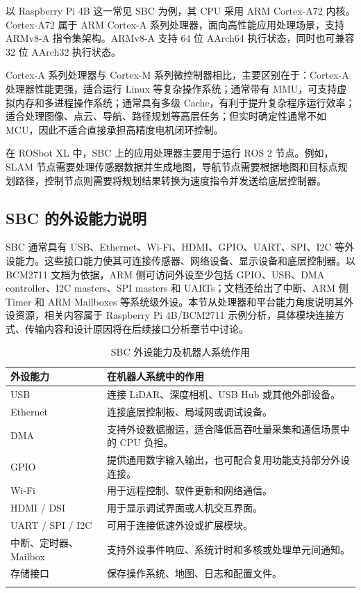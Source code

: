 \documentclass[UTF8,a4paper,12pt]{ctexrep}
\newcommand{\tabrowline}{\specialrule{0.25pt}{0pt}{0pt}}
\begin{document}
以 Raspberry Pi 4B 这一常见 SBC 为例，其 CPU 采用 ARM Cortex-A72 内核。Cortex-A72 属于 ARM Cortex-A 系列处理器，面向高性能应用处理场景，支持 ARMv8-A 指令集架构。ARMv8-A 支持 64 位 AArch64 执行状态，同时也可兼容 32 位 AArch32 执行状态。

Cortex-A 系列处理器与 Cortex-M 系列微控制器相比，主要区别在于：Cortex-A 处理器性能更强，适合运行 Linux 等复杂操作系统；通常带有 MMU，可支持虚拟内存和多进程操作系统；通常具有多级 Cache，有利于提升复杂程序运行效率；适合处理图像、点云、导航、路径规划等高层任务；但实时确定性通常不如 MCU，因此不适合直接承担高精度电机闭环控制。

在 ROSbot XL 中，SBC 上的应用处理器主要用于运行 ROS 2 节点。例如，SLAM 节点需要处理传感器数据并生成地图，导航节点需要根据地图和目标点规划路径，控制节点则需要将规划结果转换为速度指令并发送给底层控制器。

\subsection{SBC 的外设能力说明}

SBC 通常具有 USB、Ethernet、Wi-Fi、HDMI、GPIO、UART、SPI、I2C 等外设能力。这些接口能力使其可连接传感器、网络设备、显示设备和底层控制器。以 BCM2711 文档为依据，ARM 侧可访问外设至少包括 GPIO、USB、DMA controller、I2C masters、SPI masters 和 UARTs；文档还给出了中断、ARM 侧 Timer 和 ARM Mailboxes 等系统级外设。本节从处理器和平台能力角度说明其外设资源，相关内容属于 Raspberry Pi 4B/BCM2711 示例分析，具体模块连接方式、传输内容和设计原因将在后续接口分析章节中讨论。

\begin{table}[H]
  \centering
  \caption{SBC 外设能力及机器人系统作用}
  \label{tab:sbc-io}
  \small
  \begin{tabularx}{\textwidth}{L{3.4cm}Y}
    \toprule
    \textbf{外设能力} & \textbf{在机器人系统中的作用} \\
    \midrule
    USB & 连接 LiDAR、深度相机、USB Hub 或其他外部设备。 \\
    \tabrowline
    Ethernet & 连接底层控制板、局域网或调试设备。 \\
    \tabrowline
    DMA & 支持外设数据搬运，适合降低高吞吐量采集和通信场景中的 CPU 负担。 \\
    \tabrowline
    GPIO & 提供通用数字输入输出，也可配合复用功能支持部分外设连接。 \\
    \tabrowline
    Wi-Fi & 用于远程控制、软件更新和网络通信。 \\
    \tabrowline
    HDMI / DSI & 用于显示调试界面或人机交互界面。 \\
    \tabrowline
    UART / SPI / I2C & 可用于连接低速外设或扩展模块。 \\
    \tabrowline
    中断、定时器、Mailbox & 支持外设事件响应、系统计时和多核或处理单元间通知。 \\
    \tabrowline
    存储接口 & 保存操作系统、地图、日志和配置文件。 \\
    \bottomrule
  \end{tabularx}
\end{table}
\end{document}
